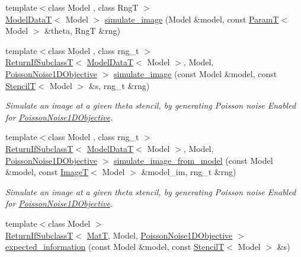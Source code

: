 \begin{DoxyCompactItemize}
\item 
{\footnotesize template$<$class Model , class RngT $>$ }\\\hyperlink{namespacemappel_a97f050df953605381ae9c901c3b125f1}{Model\+DataT}$<$ Model $>$ \hyperlink{namespacemappel_1_1methods_abd0aa1868ba545867d80bf166aaeed03}{simulate\+\_\+image} (Model \&model, const \hyperlink{namespacemappel_a667925cb0d6c0e49f2f035cc5a9a6857}{ParamT}$<$ Model $>$ \&theta, RngT \&rng)
\item 
{\footnotesize template$<$class Model , class rng\+\_\+t $>$ }\\\hyperlink{namespacemappel_a3b77d227658ba3ba9e16fea6fa6e626d}{Return\+If\+SubclassT}$<$ \hyperlink{namespacemappel_a97f050df953605381ae9c901c3b125f1}{Model\+DataT}$<$ Model $>$, Model, \hyperlink{classmappel_1_1PoissonNoise1DObjective}{Poisson\+Noise1\+D\+Objective} $>$ \hyperlink{namespacemappel_1_1methods_abe1122f5c810f1b41c391a7e724fd74d}{simulate\+\_\+image} (const Model \&model, const \hyperlink{namespacemappel_a3a06598240007876f8c4bf834ad86197}{StencilT}$<$ Model $>$ \&s, rng\+\_\+t \&rng)
\begin{DoxyCompactList}\small\item\em Simulate an image at a given theta stencil, by generating Poisson noise Enabled for \hyperlink{classmappel_1_1PoissonNoise1DObjective}{Poisson\+Noise1\+D\+Objective}. \end{DoxyCompactList}\item 
{\footnotesize template$<$class Model , class rng\+\_\+t $>$ }\\\hyperlink{namespacemappel_a3b77d227658ba3ba9e16fea6fa6e626d}{Return\+If\+SubclassT}$<$ \hyperlink{namespacemappel_a97f050df953605381ae9c901c3b125f1}{Model\+DataT}$<$ Model $>$, Model, \hyperlink{classmappel_1_1PoissonNoise1DObjective}{Poisson\+Noise1\+D\+Objective} $>$ \hyperlink{namespacemappel_1_1methods_a4a6ea9893f28e1f5c2604d8c3e7b6852}{simulate\+\_\+image\+\_\+from\+\_\+model} (const Model \&model, const \hyperlink{namespacemappel_a14658186b77757f3c35a69cb1be6cf4b}{ImageT}$<$ Model $>$ \&model\+\_\+im, rng\+\_\+t \&rng)
\begin{DoxyCompactList}\small\item\em Simulate an image at a given theta stencil, by generating Poisson noise Enabled for \hyperlink{classmappel_1_1PoissonNoise1DObjective}{Poisson\+Noise1\+D\+Objective}. \end{DoxyCompactList}\item 
{\footnotesize template$<$class Model $>$ }\\\hyperlink{namespacemappel_a3b77d227658ba3ba9e16fea6fa6e626d}{Return\+If\+SubclassT}$<$ \hyperlink{namespacemappel_a7091ab87c528041f7e2027195fad8915}{MatT}, Model, \hyperlink{classmappel_1_1PoissonNoise1DObjective}{Poisson\+Noise1\+D\+Objective} $>$ \hyperlink{namespacemappel_1_1methods_a07072e1c0c19cbffa6878362056f5758}{expected\+\_\+information} (const Model \&model, const \hyperlink{namespacemappel_a3a06598240007876f8c4bf834ad86197}{StencilT}$<$ Model $>$ \&s)

\end{DoxyCompactItemize}
